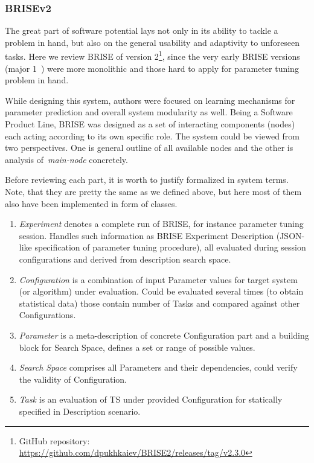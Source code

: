 \subsubsection{BRISEv2~\cite{brise2spl}}
The great part of software potential lays not only in its ability to tackle a problem in hand, but also on the general usability and adaptivity to unforeseen tasks.
Here we review BRISE of version 2\footnote[1]{GitHub repository: \url{https://github.com/dpukhkaiev/BRISE2/releases/tag/v2.3.0}}, since the very early BRISE versions (major 1~\cite{brise1monolite}) were more monolithic and those hard to apply for parameter tuning problem in hand.

While designing this system, authors were focused on learning mechanisms for parameter prediction and overall system modularity as well.
Being a Software Product Line, BRISE was designed as a set of interacting components (nodes) each acting according to its own specific role. 
The system could be viewed from two perspectives. One is general outline of all available nodes and the other is analysis of~\textit{main-node} concretely.

Before reviewing each part, it is worth to justify formalized in system terms. Note, that they are pretty the same as we defined above, but here most of them also have been implemented in form of classes.
\begin{enumerate}
	\item \textit{Experiment} denotes a complete run of BRISE, for instance parameter tuning session. Handles such information as BRISE Experiment Description (JSON-like specification of parameter tuning procedure), all evaluated during session configurations and derived from description search space.

	\item \textit{Configuration} is a combination of input Parameter values for target system (or algorithm) under evaluation. Could be evaluated several times (to obtain statistical data) those contain number of Tasks and compared against other Configurations.

	\item \textit{Parameter} is a meta-description of concrete Configuration part and a building block for Search Space, defines a set or range of possible values. 

	\item \textit{Search Space} comprises all Parameters and their dependencies, could verify the validity of Configuration.

	\item \textit{Task} is an evaluation of TS under provided Configuration for statically specified in Description scenario.
\end{enumerate}

